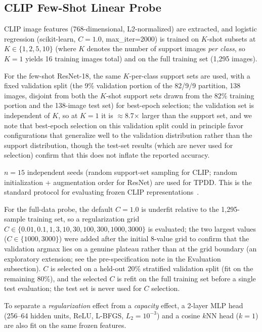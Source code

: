 \documentclass[10pt,a4paper]{article}
\begin{document}
\subsection{CLIP Few-Shot Linear Probe}

CLIP image features (768-dimensional, L2-normalized) are extracted, and logistic regression (scikit-learn, $C=1.0$, max\_iter=2000) is trained on $K$-shot subsets at $K\in\{1,2,5,10\}$ (where $K$ denotes the number of support images \emph{per class}, so $K=1$ yields 16 training images total) and on the full training set (1,295 images).

For the few-shot ResNet-18, the same $K$-per-class support sets are used, with a fixed validation split (the 9\% validation portion of the 82/9/9 partition, 138 images, disjoint from both the $K$-shot support sets drawn from the 82\% training portion and the 138-image test set) for best-epoch selection; the validation set is independent of $K$, so at $K{=}1$ it is $\approx$8.7$\times$ larger than the support set, and we note that best-epoch selection on this validation split could in principle favor configurations that generalize well to the validation distribution rather than the support distribution, though the test-set results (which are never used for selection) confirm that this does not inflate the reported accuracy.

$n=15$ independent seeds (random support-set sampling for CLIP; random initialization + augmentation order for ResNet) are used for TPDD.
This is the standard protocol for evaluating frozen CLIP representations~\cite{radford2021learning}.

For the full-data probe, the default $C{=}1.0$ is underfit relative to the 1,295-sample training set, so a regularization grid $C\in\{0.01,0.1,1,3,10,30,100,300,1000,3000\}$ is evaluated; the two largest values ($C\in\{1000,3000\}$) were added after the initial 8-value grid to confirm that the validation argmax lies on a genuine plateau rather than at the grid boundary (an exploratory extension; see the pre-specification note in the Evaluation subsection). $C$ is selected on a held-out 20\% stratified validation split (fit on the remaining 80\%), and the selected $C$ is refit on the full training set before a single test evaluation; the test set is never used for $C$ selection.

To separate a \emph{regularization} effect from a \emph{capacity} effect, a 2-layer MLP head (256--64 hidden units, ReLU, L-BFGS, $L_2{=}10^{-3}$) and a cosine $k$NN head ($k{=}1$) are also fit on the same frozen features.
\end{document}
